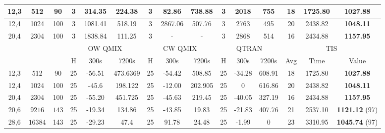 \documentclass[runningheads]{llncs}
\begin{document}
\begin{table}[t]
\begin{tabular}{|c|c|c||c|c|c||c|c|c||c|c|c||c|c|c||}
        \hline
         12,3 & 512 & 90    & 3 & 314.35 & 224.38 & 3 & 82.86 & 738.88 & 3 &  2018 & 755 & 18 & 1725.80 & \textbf{1027.88} \\
         
         \hline
      
         
         12,4 & 1024 & 100 & 3 & 1081.41 & 518.19 & 3 & 2867.06 & 507.76 & 3 & 2763 & 495 & 20 & 2438.82 & \textbf{1048.11}  \\
         
         \hline
       
         
         20,4 & 2304 & 100  & 3 & 1838.84 & 111.25 & 3 & - & -  & 3 & 2868 & 514 & 16 & 2434.88 & \textbf{1157.95} \\
         \hline \hline
         
         \multicolumn{3}{|c||}{} &\multicolumn{3}{|c||}{OW QMIX} & \multicolumn{3}{c||}{CW QMIX} & \multicolumn{3}{c||}{QTRAN} & \multicolumn{3}{c||}{TIS}\\
         \hline
         \multicolumn{3}{|c||}{} & H & 300s & 7200s & H & 300s & 7200s & H & 300s & 7200s & Avg & Time & Value\\
         \hline
         12,3 & 512 & 90  & 25 & -56.51 & 473.6369 & 25 & -54.42 & 508.85 & 25 & -34.28 & 608.91 & 18 & 1725.80 & \textbf{1027.88}\\
         
         \hline
         
         12,4 & 1024 & 100  & 25 & -45.6 & 198.122 & 25 & -12.00 & 202.905 & 25 & 0 & 616.86 & 20 & 2438.82 & \textbf{1048.11}\\
         
         \hline
         
         20,4 & 2304 & 100   & 25 & -55.20 & 451.725 & 25 & -45.63 & 219.45 & 25 & -40.05 & 327.19 & 16 & 2434.88 & \textbf{1157.95}\\
         \hline
         
         20,6 &
         $9216$&$143$  &25 &-19.34  & 134.86 &25& -43.85 & 19.83 &25& -21.83 & 407.76 & 21 & 2537.10 & \textbf{1121.12} (97) \\
         
         \hline
         28,6 &
         $16384$& 143   &25&-29.23 & 47.4 &25& 91.78 & 24.48 &25 & -1.99 & 0  & 23 & 3310.95 & \textbf{1045.74} (97)\\
         \hline
         

\end{tabular}
\end{table}
\end{document}

